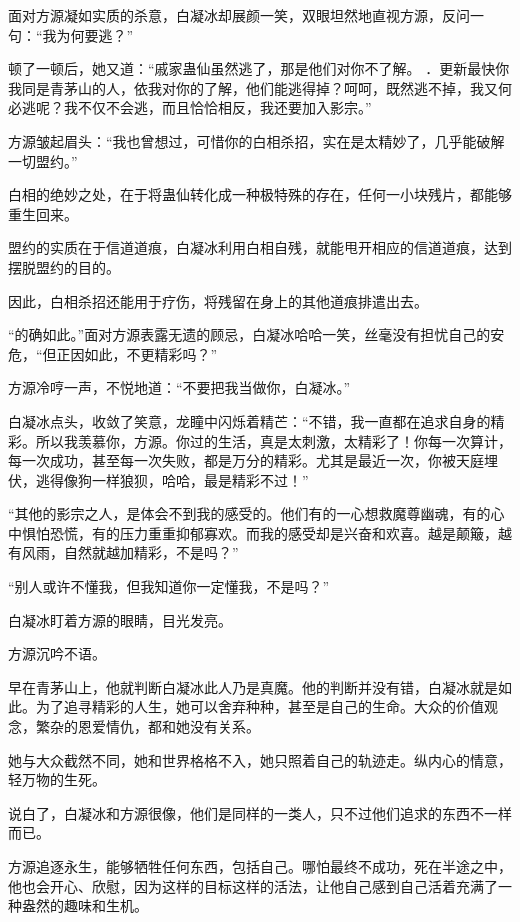 
\begin{this_body}



面对方源凝如实质的杀意，白凝冰却展颜一笑，双眼坦然地直视方源，反问一句：“我为何要逃？”

顿了一顿后，她又道：“戚家蛊仙虽然逃了，那是他们对你不了解。 ．更新最快你我同是青茅山的人，依我对你的了解，他们能逃得掉？呵呵，既然逃不掉，我又何必逃呢？我不仅不会逃，而且恰恰相反，我还要加入影宗。”

方源皱起眉头：“我也曾想过，可惜你的白相杀招，实在是太精妙了，几乎能破解一切盟约。”

白相的绝妙之处，在于将蛊仙转化成一种极特殊的存在，任何一小块残片，都能够重生回来。

盟约的实质在于信道道痕，白凝冰利用白相自残，就能甩开相应的信道道痕，达到摆脱盟约的目的。

因此，白相杀招还能用于疗伤，将残留在身上的其他道痕排遣出去。

“的确如此。”面对方源表露无遗的顾忌，白凝冰哈哈一笑，丝毫没有担忧自己的安危，“但正因如此，不更精彩吗？”

方源冷哼一声，不悦地道：“不要把我当做你，白凝冰。”

白凝冰点头，收敛了笑意，龙瞳中闪烁着精芒：“不错，我一直都在追求自身的精彩。所以我羡慕你，方源。你过的生活，真是太刺激，太精彩了！你每一次算计，每一次成功，甚至每一次失败，都是万分的精彩。尤其是最近一次，你被天庭埋伏，逃得像狗一样狼狈，哈哈，最是精彩不过！”

“其他的影宗之人，是体会不到我的感受的。他们有的一心想救魔尊幽魂，有的心中惧怕恐慌，有的压力重重抑郁寡欢。而我的感受却是兴奋和欢喜。越是颠簸，越有风雨，自然就越加精彩，不是吗？”

“别人或许不懂我，但我知道你一定懂我，不是吗？”

白凝冰盯着方源的眼睛，目光发亮。

方源沉吟不语。

早在青茅山上，他就判断白凝冰此人乃是真魔。他的判断并没有错，白凝冰就是如此。为了追寻精彩的人生，她可以舍弃种种，甚至是自己的生命。大众的价值观念，繁杂的恩爱情仇，都和她没有关系。

她与大众截然不同，她和世界格格不入，她只照着自己的轨迹走。纵内心的情意，轻万物的生死。

说白了，白凝冰和方源很像，他们是同样的一类人，只不过他们追求的东西不一样而已。

方源追逐永生，能够牺牲任何东西，包括自己。哪怕最终不成功，死在半途之中，他也会开心、欣慰，因为这样的目标这样的活法，让他自己感到自己活着充满了一种盎然的趣味和生机。


\end{this_body}
